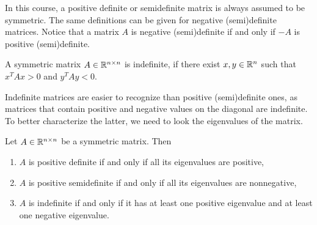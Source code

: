 \documentclass[10pt,a4paper]{article}
\begin{document}
\noindent In this course, a positive definite or semidefinite matrix is always assumed to be symmetric. The same definitions can be given for negative (semi)definite matrices. Notice that a matrix $A$ is negative (semi)definite if and only if $-A$ is positive (semi)definite.
\begin{definition}[Indefiniteness]
	A symmetric matrix $A\in \mathbb{R}^{n\times n}$ is indefinite, if there exist $x,y \in \mathbb{R}^n$ such that $x^TAx> 0$ and $y^TAy<0$.
\end{definition}
Indefinite matrices are easier to recognize than positive (semi)definite ones, as matrices that contain positive and negative values on the diagonal are indefinite. %
To better characterize the latter, we need to look the eigenvalues of the matrix.
\begin{theorem}
	Let $A\in \mathbb{R}^{n\times n}$ be a symmetric matrix. Then
	\begin{enumerate}
		\item $A$ is positive definite if and only if all its eigenvalues are positive,
		\item $A$ is positive semidefinite if and only if all its eigenvalues are nonnegative,
		\item $A$ is indefinite if and only if it has at least one positive eigenvalue and at least one
		negative eigenvalue.
	\end{enumerate}
\end{theorem}
\end{document}
